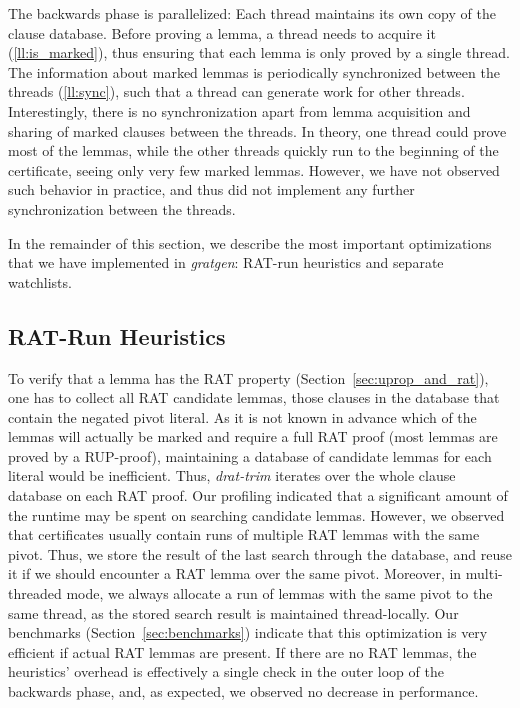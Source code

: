 \documentclass[smallcondensed]{svjour3}     %
\begin{document}
The backwards phase is parallelized: Each thread maintains its own copy of the clause database. 
Before proving a lemma, a thread needs to acquire it (\ref{ll:is_marked}), thus ensuring that each lemma is only proved by a single thread.
The information about marked lemmas is periodically synchronized between the threads (\ref{ll:sync}), such that a thread can generate work for other threads.
Interestingly, there is no synchronization apart from lemma acquisition and sharing of marked clauses between the 
threads. In theory, one thread could prove most of the lemmas, while the other threads quickly run to the beginning of the certificate, 
seeing only very few marked lemmas. However, we have not observed such behavior in practice, and thus did not implement any further synchronization
between the threads.

In the remainder of this section, we describe the most important optimizations that we have implemented in {\sl gratgen}: RAT-run heuristics and separate watchlists.

\subsection{RAT-Run Heuristics}
To verify that a lemma has the RAT property (\cf Section~\ref{sec:uprop_and_rat}), one has to collect all RAT candidate lemmas, \ie those clauses in the 
database that contain the negated pivot literal. As it is not known in advance which of the lemmas will
actually be marked and require a full RAT proof (most lemmas are proved by a RUP-proof), maintaining a database of candidate 
lemmas for each literal would be inefficient. Thus, {\sl drat-trim} iterates over the whole clause database on each RAT proof. Our profiling indicated that a significant amount of the runtime may be spent on searching candidate lemmas. However, we observed that certificates
usually contain runs of multiple RAT lemmas with the same pivot. Thus, we store the result of the last search through the database, and reuse it if 
we should encounter a RAT lemma over the same pivot. Moreover, in multi-threaded mode, we always allocate a run of lemmas with the same pivot to the 
same thread, as the stored search result is maintained thread-locally. Our benchmarks (Section~\ref{sec:benchmarks}) indicate that this optimization is very efficient if actual RAT lemmas are present. If there are no RAT lemmas, the heuristics' overhead is effectively a single check in the outer loop
of the backwards phase, and, as expected, we observed no decrease in performance.
\end{document}

